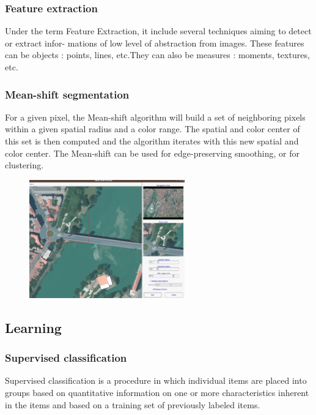 \subsubsection{Feature extraction}

Under the term Feature Extraction, it include several techniques
aiming to detect or extract infor- mations of low level of abstraction
from images. These features can be objects : points, lines, etc.They
can also be measures : moments, textures, etc.

\subsubsection{Mean-shift segmentation}

For a given pixel, the Mean-shift algorithm will build a set of
neighboring pixels within a given spatial radius and a color
range. The spatial and color center of this set is then computed and
the algorithm iterates with this new spatial and color center. The
Mean-shift can be used for edge-preserving smoothing, or for
clustering.

\begin{figure}
  \center
  \includegraphics[width=0.6\textwidth]{../Art/MonteverdiImages/monteverdi_mean_shift.png}
  \label{fig:meanshift}
\end{figure}

\subsection{Learning}
\subsubsection{Supervised classification}
Supervised classification is a procedure in which individual items are
placed into groups based on quantitative information on one or more
characteristics inherent in the items and based on a training set of
previously labeled items.

